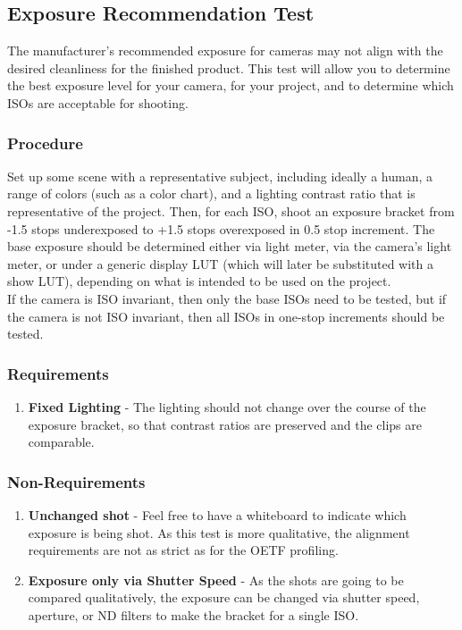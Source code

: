 \documentclass[twoside]{article}
\begin{document}
\subsection{Exposure Recommendation Test}
The manufacturer's recommended exposure for cameras may not align with the desired cleanliness for the finished product. This test will allow you to determine the best exposure level for your camera, for your project, and to determine which ISOs are acceptable for shooting. \\

\subsubsection{Procedure}
Set up some scene with a representative subject, including ideally a human, a range of colors (such as a color chart), and a lighting contrast ratio that is representative of the project. Then, for each ISO, shoot an exposure bracket from -1.5 stops underexposed to +1.5 stops overexposed in 0.5 stop increment. The base exposure should be determined either via light meter, via the camera's light meter, or under a generic display LUT (which will later be substituted with a show LUT), depending on what is intended to be used on the project. \\

If the camera is ISO invariant, then only the base ISOs need to be tested, but if the camera is not ISO invariant, then all ISOs in one-stop increments should be tested. \\

\subsubsection{Requirements}
\begin{enumerate}
    \item \textbf{Fixed Lighting} - The lighting should not change over the course of the exposure bracket, so that contrast ratios are preserved and the clips are comparable.
\end{enumerate}

\subsubsection{Non-Requirements}
\begin{enumerate}
    \item \textbf{Unchanged shot} - Feel free to have a whiteboard to indicate which exposure is being shot. As this test is more qualitative, the alignment requirements are not as strict as for the OETF profiling.
    \item \textbf{Exposure only via Shutter Speed} - As the shots are going to be compared qualitatively, the exposure can be changed via shutter speed, aperture, or ND filters to make the bracket for a single ISO.
\end{enumerate}
\end{document}
